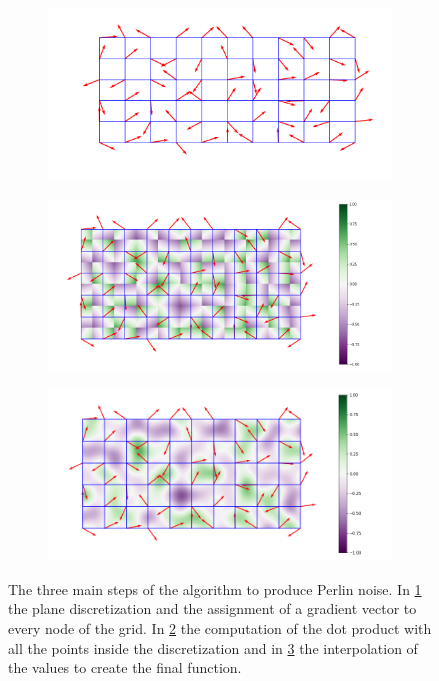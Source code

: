 \begin{figure}
    \centering
    \begin{subfigure}[b]{0.3\textwidth}
         \centering
         \includegraphics[width = \textwidth]{images/grid_grad}
         \caption{}
         \label{fig:grid_grad}
    \end{subfigure}
    \hfill
    \begin{subfigure}[b]{0.3\textwidth}
         \centering
         \includegraphics[width = \textwidth]{images/PerlinNoiseDotProducts}
         \caption{}
         \label{fig:dot_prod}
    \end{subfigure}
    \hfill
    \begin{subfigure}[b]{0.3\textwidth}
         \centering
         \includegraphics[width = \textwidth]{images/PerlinNoiseInterpolated}
         \caption{}
         \label{fig:interp}
    \end{subfigure}
    \caption{The three main steps of the algorithm to produce Perlin noise. In \ref{fig:grid_grad} the plane discretization and the assignment of a gradient vector to every node of the grid. In \ref{fig:dot_prod} the computation of the dot product with all the points inside the discretization and in \ref{fig:interp} the interpolation of the values to create the final function.}
    \label{fig:perlin_alg}
\end{figure}

